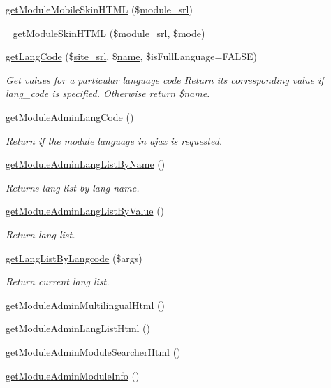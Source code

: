 \begin{DoxyCompactItemize}
\hyperlink{classmoduleAdminModel_a38c85d9c28facff15f1c54ebe1e5b70b}{get\+Module\+Mobile\+Skin\+H\+T\+ML} (\$\hyperlink{ko_8install_8php_a370bb6450fab1da3e0ed9f484a38b761}{module\+\_\+srl})
\item 
\hyperlink{classmoduleAdminModel_ac69c4e024dcabbcaa3f7a13a4c61af04}{\+\_\+get\+Module\+Skin\+H\+T\+ML} (\$\hyperlink{ko_8install_8php_a370bb6450fab1da3e0ed9f484a38b761}{module\+\_\+srl}, \$mode)
\item 
\hyperlink{classmoduleAdminModel_aa10dc8b8645165816c43f140c57b546b}{get\+Lang\+Code} (\$\hyperlink{ko_8install_8php_a8b1406b4ad1048041558dce6bfe89004}{site\+\_\+srl}, \$\hyperlink{common_8js_a22c29d2aa8ed6161ce8faa718ef76e68}{name}, \$is\+Full\+Language=F\+A\+L\+SE)
\begin{DoxyCompactList}\small\item\em Get values for a particular language code Return its corresponding value if lang\+\_\+code is specified. Otherwise return \$name. \end{DoxyCompactList}\item 
\hyperlink{classmoduleAdminModel_a783b7e9e5a0db68d0eb782fff6f7e461}{get\+Module\+Admin\+Lang\+Code} ()
\begin{DoxyCompactList}\small\item\em Return if the module language in ajax is requested. \end{DoxyCompactList}\item 
\hyperlink{classmoduleAdminModel_ab5982d758fb39c6d56c41af9827845cf}{get\+Module\+Admin\+Lang\+List\+By\+Name} ()
\begin{DoxyCompactList}\small\item\em Returns lang list by lang name. \end{DoxyCompactList}\item 
\hyperlink{classmoduleAdminModel_acd8e42367271f853d4da4388fe15b0d1}{get\+Module\+Admin\+Lang\+List\+By\+Value} ()
\begin{DoxyCompactList}\small\item\em Return lang list. \end{DoxyCompactList}\item 
\hyperlink{classmoduleAdminModel_a425b28af6d0f27c2306191d7a4abdbaa}{get\+Lang\+List\+By\+Langcode} (\$args)
\begin{DoxyCompactList}\small\item\em Return current lang list. \end{DoxyCompactList}\item 
\hyperlink{classmoduleAdminModel_a51568f16c761da74a811fe599970ea0f}{get\+Module\+Admin\+Multilingual\+Html} ()
\item 
\hyperlink{classmoduleAdminModel_a1f3f518448a54604d56032927b4ef957}{get\+Module\+Admin\+Lang\+List\+Html} ()
\item 
\hyperlink{classmoduleAdminModel_aca064d49155437d5cad912d1f885933f}{get\+Module\+Admin\+Module\+Searcher\+Html} ()
\item 
\hyperlink{classmoduleAdminModel_a205c97c3919ee573047431c8c2a0e1a7}{get\+Module\+Admin\+Module\+Info} ()
\end{DoxyCompactItemize}

